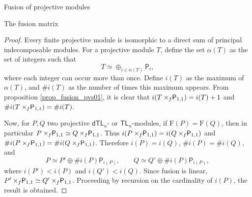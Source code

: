 \documentclass[reqno]{amsart}
\newcommand{\dtl}[1]{\mathsf{dTL}_{#1}}
\newcommand{\tl}[1]{\mathsf{TL}_{#1}}
\newcommand{\dP}[1]{\mathsf P_{#1}}
\newcommand{\xf}{\times\hspace{-0.27em}_f}
\begin{document}
\begin{section}{Fusion of projective modules}
\begin{subsection}{The fusion matrix}
\begin{proof}
Every finite projective module is isomorphic to a direct sum of principal indecomposable modules. For a projective module $T$, define the set $\alpha(T)$ as the set of integers such that $$T \simeq \oplus_{i \in \alpha(T)} \dP{i}, $$ where each integer can occur more than once. Define $i(T)$ as the maximum of $\alpha(T)$, and $\# i(T)$ as the number of times this maximum appears. From proposition \ref{prop_fusion_pvs01}, it is clear that $ i(T\xf \dP{1,1}) = i(T) + 1$ and $ \# i(T\xf \dP{1,1}) = \# i(T)$.

Now, for $P,Q$ two projective $\dtl{n}$- or $\tl{n}$-modules, if $\text{F}(P) = \text{F}(Q)$, then in particular $ P \xf \dP{1,1} \simeq Q\xf \dP{1,1}$. Thus $i(P\xf \dP{1,1}) = i(Q\xf \dP{1,1})$ and $\# i(P\xf \dP{1,1}) = \# i(Q\xf \dP{1,1})$. Therefore $i(P)= i(Q)$, $\# i(P)=\# i(Q)$, and
\begin{equation}
P \simeq P' \oplus \# i(P)\dP{i(P)}, \qquad Q \simeq Q' \oplus \# i(P) \dP{i(P)},
\end{equation}
where $i(P') < i(P)$ and $i(Q')<i(Q)$. Since fusion is linear, $ P' \xf \dP{1,1} \simeq Q'\xf \dP{1,1}$. Proceeding by recursion on the cardinality of $i(P)$, the result is obtained.
\end{proof}



\end{subsection}
\end{section}
\end{document}
